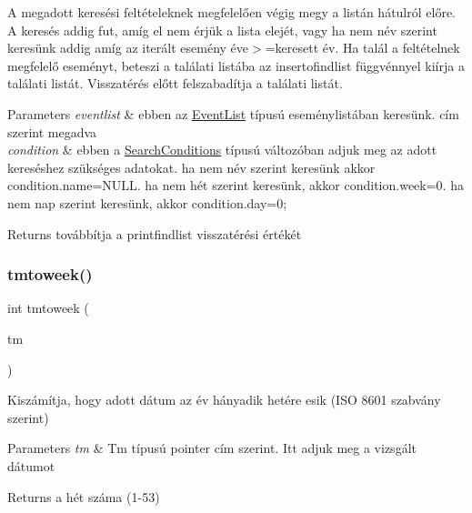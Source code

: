 A megadott keresési feltételeknek megfelelően végig megy a listán hátulról előre. A keresés addig fut, amíg el nem érjük a lista elejét, vagy ha nem név szerint keresünk addig amíg az iterált esemény éve$>$=keresett év. Ha talál a feltételnek megfelelő eseményt, beteszi a találati listába az insertofindlist függvénnyel kiírja a találati listát. Visszatérés előtt felszabadítja a találati listát. 
\begin{DoxyParams}{Parameters}
{\em eventlist} & ebben az \hyperlink{struct_event_list}{Event\+List} típusú eseménylistában keresünk. cím szerint megadva \\
\hline
{\em condition} & ebben a \hyperlink{struct_search_conditions}{Search\+Conditions} típusú változóban adjuk meg az adott kereséshez szükséges adatokat. ha nem név szerint keresünk akkor condition.\+name=N\+U\+LL. ha nem hét szerint keresünk, akkor condition.\+week=0. ha nem nap szerint keresünk, akkor condition.\+day=0; \\
\hline
\end{DoxyParams}
\begin{DoxyReturn}{Returns}
továbbítja a printfindlist visszatérési értékét 
\end{DoxyReturn}
\mbox{\label{group__search_ga4e80bfd47c2fef45e9f6f50632544931}} 
\subsubsection{\texorpdfstring{tmtoweek()}{tmtoweek()}}
{\footnotesize\ttfamily int tmtoweek (\begin{DoxyParamCaption}\item[{\hyperlink{group__list_gaffc453d30a4a6ce81ed778fd04d2d256}{Tm} $\ast$}]{tm }\end{DoxyParamCaption})}

Kiszámítja, hogy adott dátum az év hányadik hetére esik (I\+SO 8601 szabvány szerint) 
\begin{DoxyParams}{Parameters}
{\em tm} & Tm típusú pointer cím szerint. Itt adjuk meg a vizsgált dátumot \\
\hline
\end{DoxyParams}
\begin{DoxyReturn}{Returns}
a hét száma (1-\/53) 
\end{DoxyReturn}
